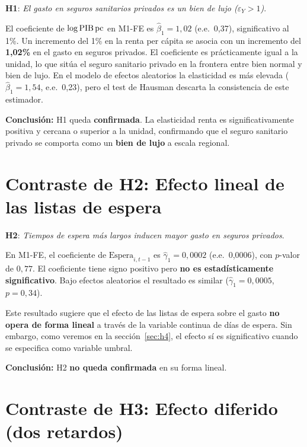 \textbf{H1}: \textit{El gasto en seguros sanitarios privados es un bien de lujo
($\varepsilon_Y > 1$)}.

El coeficiente de $\log\text{PIB\,pc}$ en M1-FE es $\hat{\beta}_1 = 1{,}02$
(e.e.\ 0{,}37), significativo al 1\%. Un incremento del 1\% en la renta per
cápita se asocia con un incremento del \textbf{1{,}02\%} en el gasto en seguros
privados. El coeficiente es prácticamente igual a la unidad, lo que sitúa el
seguro sanitario privado en la frontera entre bien normal y bien de lujo. En el
modelo de efectos aleatorios la elasticidad es más elevada
($\hat{\beta}_1 = 1{,}54$, e.e.\ 0{,}23), pero el test de Hausman descarta la
consistencia de este estimador.

\textbf{Conclusión:} H1 queda \textbf{confirmada}. La elasticidad renta es
significativamente positiva y cercana o superior a la unidad, confirmando que
el seguro sanitario privado se comporta como un \textbf{bien de lujo} a escala
regional.

\section{Contraste de H2: Efecto lineal de las listas de espera}
\label{sec:h2}

\textbf{H2}: \textit{Tiempos de espera más largos inducen mayor gasto en
seguros privados}.

En M1-FE, el coeficiente de $\text{Espera}_{i,t-1}$ es $\hat{\gamma}_1 = 0{,}0002$
(e.e.\ 0{,}0006), con $p$-valor de $0{,}77$. El coeficiente tiene signo positivo
pero \textbf{no es estadísticamente significativo}. Bajo efectos aleatorios el
resultado es similar ($\hat{\gamma}_1 = 0{,}0005$, $p = 0{,}34$).

Este resultado sugiere que el efecto de las listas de espera sobre el gasto
\textbf{no opera de forma lineal} a través de la variable continua de días de
espera. Sin embargo, como veremos en la sección~\ref{sec:h4}, el efecto sí es
significativo cuando se especifica como variable umbral.

\textbf{Conclusión:} H2 \textbf{no queda confirmada} en su forma lineal.

\section{Contraste de H3: Efecto diferido (dos retardos)}
\label{sec:h3}

